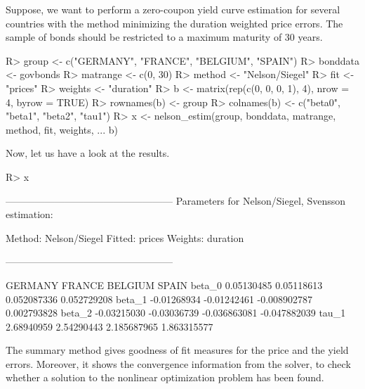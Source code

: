 Suppose, we want to perform a zero-coupon yield curve estimation for several countries with the \cite{Nelson1987} method minimizing the duration weighted price errors. The sample of bonds should be restricted to a maximum maturity of 30 years. 

\begin{Schunk}
\begin{Sinput}
R> group <- c("GERMANY", "FRANCE", "BELGIUM", "SPAIN")
R> bonddata <- govbonds
R> matrange <- c(0, 30)
R> method <- "Nelson/Siegel"
R> fit <- "prices"
R> weights <- "duration"
R> b <- matrix(rep(c(0, 0, 0, 1), 4), nrow = 4, byrow = TRUE)
R> rownames(b) <- group
R> colnames(b) <- c("beta0", "beta1", "beta2", "tau1")
R> x <- nelson_estim(group, bonddata, matrange, method, fit, weights, 
...    b)
\end{Sinput}
\end{Schunk}

Now, let us have a look at the results.

\begin{Schunk}
\begin{Sinput}
R> x
\end{Sinput}
\begin{Soutput}
---------------------------------------------------
Parameters for Nelson/Siegel, Svensson estimation:

Method: Nelson/Siegel 
Fitted: prices 
Weights: duration 

---------------------------------------------------

           GERMANY      FRANCE      BELGIUM        SPAIN
beta_0  0.05130485  0.05118613  0.052087336  0.052729208
beta_1 -0.01268934 -0.01242461 -0.008902787  0.002793828
beta_2 -0.03215030 -0.03036739 -0.036863081 -0.047882039
tau_1   2.68940959  2.54290443  2.185687965  1.863315577
\end{Soutput}
\end{Schunk}

The summary method gives goodness of fit measures for the price and the yield errors. Moreover, it shows the convergence information from the solver, to check whether a solution to the nonlinear optimization problem has been found.

